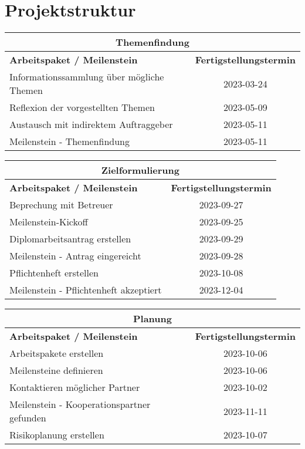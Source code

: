 \chapter{Projektstruktur}
\begin{table}[!ht]
	\begin{tabular}{|l|c|}
		\multicolumn{2}{c}{\textbf{Themenfindung}} \\ \hline
		\textbf{Arbeitspaket / Meilenstein} & \textbf{Fertigstellungstermin} \\ \hline
		Informationssammlung über mögliche Themen & 2023-03-24 \\ \hline
		Reflexion der vorgestellten Themen & 2023-05-09 \\ \hline
		Austausch mit indirektem Auftraggeber & 2023-05-11 \\ \hline
		Meilenstein - Themenfindung & 2023-05-11 \\ \hline
	\end{tabular}
\end{table}

\begin{table}[!ht]
	\begin{tabular}{|l|c|}
		\multicolumn{2}{c}{\textbf{Zielformulierung}} \\ \hline
		\textbf{Arbeitspaket / Meilenstein} & \textbf{Fertigstellungstermin} \\ \hline
		Beprechung mit Betreuer & 2023-09-27 \\ \hline
		Meilenstein-Kickoff & 2023-09-25 \\ \hline
		Diplomarbeitsantrag erstellen & 2023-09-29 \\ \hline
		Meilenstein - Antrag eingereicht & 2023-09-28 \\ \hline
		Pflichtenheft erstellen & 2023-10-08 \\ \hline
		Meilenstein - Pflichtenheft akzeptiert & 2023-12-04 \\ \hline
	\end{tabular}
\end{table}

\begin{table}[!ht]
	\begin{tabular}{|l|c|}
		\multicolumn{2}{c}{\textbf{Planung}} \\ \hline
		\textbf{Arbeitspaket / Meilenstein} & \textbf{Fertigstellungstermin} \\ \hline
		Arbeitspakete erstellen & 2023-10-06 \\ \hline
		Meilensteine definieren & 2023-10-06 \\ \hline
		Kontaktieren möglicher Partner & 2023-10-02 \\ \hline
		Meilenstein - Kooperationspartner gefunden & 2023-11-11 \\ \hline
		Risikoplanung erstellen & 2023-10-07 \\ \hline
	\end{tabular}
\end{table}


